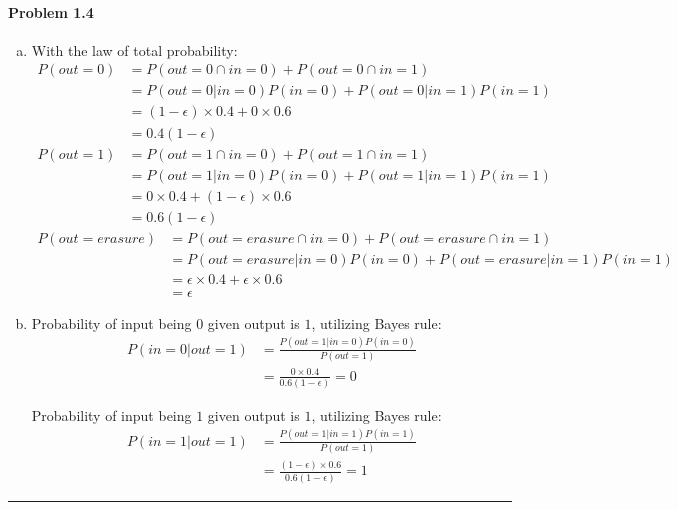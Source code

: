 \documentclass[12pt, letterpaper]{scrartcl}
\begin{document}
\paragraph*{Problem 1.4} \hfill
\begin{enumerate}[a.]
    \item With the law of total probability:\\
    \begin{align*}
        P(out=0)&=P(out=0 \cap in=0) + P(out=0 \cap in=1)\\
        &=P(out=0|in=0)P(in=0)+P(out=0|in=1)P(in=1)\\
        &=(1-\epsilon)\times0.4 + 0\times0.6\\
        &=0.4(1-\epsilon)
    \end{align*}
    \begin{align*}
        P(out=1)&=P(out=1 \cap in=0) + P(out=1 \cap in=1)\\
        &=P(out=1|in=0)P(in=0)+P(out=1|in=1)P(in=1)\\
        &= 0\times0.4+(1-\epsilon)\times0.6\\
        &=0.6(1-\epsilon)
    \end{align*}
    \begin{align*}
        P(out=erasure)&=P(out=erasure \cap in=0) + P(out=erasure \cap in=1)\\
        &=P(out=erasure|in=0)P(in=0)+P(out=erasure|in=1)P(in=1)\\
        &= \epsilon\times0.4+\epsilon\times0.6\\
        &=\epsilon
    \end{align*}
    \item Probability of input being $0$ given output is $1$, utilizing Bayes rule:
    \begin{align*}
        P(in=0|out=1)&=\frac{P(out=1|in=0)P(in=0)}{P(out=1)}\\
        &=\frac{0\times 0.4}{0.6(1-\epsilon)}=0
    \end{align*}
    
    Probability of input being $1$ given output is $1$, utilizing Bayes rule:
    \begin{align*}
        P(in=1|out=1)&=\frac{P(out=1|in=1)P(in=1)}{P(out=1)}\\
        &=\frac{(1-\epsilon)\times 0.6}{0.6(1-\epsilon)}=1
    \end{align*}
\end{enumerate}
\hrule
\end{document}
